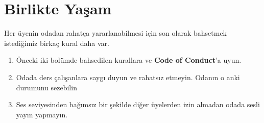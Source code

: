 \documentclass{article}
\begin{document}
\section{Birlikte Yaşam}
Her üyenin odadan rahatça yararlanabilmesi için son olarak bahsetmek istediğimiz birkaç kural daha var.
\begin{enumerate}
    \item 	Önceki iki bolümde bahsedilen kurallara ve \textbf{Code of Conduct}’a uyun.
    \item Odada ders çalışanlara saygı duyun ve rahatsız etmeyin. Odanın o anki durumunu sezebilin
    \item Ses seviyesinden bağımsız bir şekilde diğer üyelerden izin almadan odada sesli yayın yapmayın.
\end{enumerate}
\end{document}
